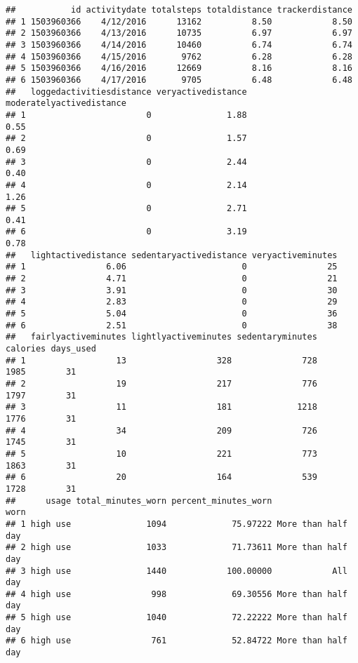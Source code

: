 \documentclass[
]{article}
\begin{document}
\begin{verbatim}
##           id activitydate totalsteps totaldistance trackerdistance
## 1 1503960366    4/12/2016      13162          8.50            8.50
## 2 1503960366    4/13/2016      10735          6.97            6.97
## 3 1503960366    4/14/2016      10460          6.74            6.74
## 4 1503960366    4/15/2016       9762          6.28            6.28
## 5 1503960366    4/16/2016      12669          8.16            8.16
## 6 1503960366    4/17/2016       9705          6.48            6.48
##   loggedactivitiesdistance veryactivedistance moderatelyactivedistance
## 1                        0               1.88                     0.55
## 2                        0               1.57                     0.69
## 3                        0               2.44                     0.40
## 4                        0               2.14                     1.26
## 5                        0               2.71                     0.41
## 6                        0               3.19                     0.78
##   lightactivedistance sedentaryactivedistance veryactiveminutes
## 1                6.06                       0                25
## 2                4.71                       0                21
## 3                3.91                       0                30
## 4                2.83                       0                29
## 5                5.04                       0                36
## 6                2.51                       0                38
##   fairlyactiveminutes lightlyactiveminutes sedentaryminutes calories days_used
## 1                  13                  328              728     1985        31
## 2                  19                  217              776     1797        31
## 3                  11                  181             1218     1776        31
## 4                  34                  209              726     1745        31
## 5                  10                  221              773     1863        31
## 6                  20                  164              539     1728        31
##      usage total_minutes_worn percent_minutes_worn               worn
## 1 high use               1094             75.97222 More than half day
## 2 high use               1033             71.73611 More than half day
## 3 high use               1440            100.00000            All day
## 4 high use                998             69.30556 More than half day
## 5 high use               1040             72.22222 More than half day
## 6 high use                761             52.84722 More than half day
\end{verbatim}
\end{document}

